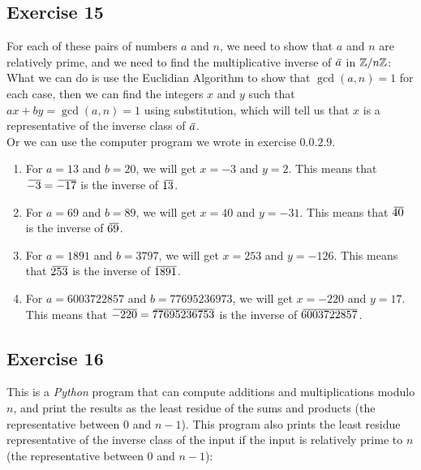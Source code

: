 \documentclass[12pt]{article}
\begin{document}
    \subsection*{Exercise 15}
    For each of these pairs of numbers $a$ and $n$,
    we need to show that $a$ and $n$ are relatively prime,
    and we need to find the multiplicative inverse of $\,\overline{\!{a}}$
    in $\mathbb{Z}/n\mathbb{Z}$: \\
    What we can do is use the Euclidian Algorithm
    to show that $\gcd(a, n) = 1$ for each case,
    then we can find the integers $x$ and $y$
    such that $ax + by = \gcd(a, n) = 1$ using substitution,
    which will tell us that $x$ is a representative of
    the inverse class of $\,\overline{\!{a}}$. \\
    Or we can use the computer program we wrote in exercise $0.0.2.9$. \\ 
    \begin{enumerate}[label=\textbf{\alph*.}]
        \item 
            For $a = 13$ and $b = 20$,
            we will get $x = -3$ and $y = 2$.
            This means that $\,\overline{\!{-3}} = \,\overline{\!{-17}}$
            is the inverse of $\,\overline{\!{13}}$.
        \item 
            For $a = 69$ and $b = 89$,
            we will get $x = 40$ and $y = -31$.
            This means that $\,\overline{\!{40}}$
            is the inverse of $\,\overline{\!{69}}$.
        \item 
            For $a = 1891$ and $b = 3797$,
            we will get $x = 253$ and $y = -126$.
            This means that $\,\overline{\!{253}}$
            is the inverse of $\,\overline{\!{1891}}$.
        \item 
            For $a = 6003722857$ and $b = 77695236973$,
            we will get $x = -220$ and $y = 17$.
            This means that $\,\overline{\!{-220}} = \,\overline{\!{77695236753}}$
            is the inverse of $\,\overline{\!{6003722857}}$.
    \end{enumerate}
 
    \subsection*{Exercise 16}
    This is a \textit{Python} program that can compute
    additions and multiplications modulo $n$,
    and print the results as the least residue of
    the sums and products (the representative between $0$ and $n-1$).
    This program also prints the least residue representative
    of the inverse class of the input if the input is relatively
    prime to $n$ (the representative between $0$ and $n-1$):
\end{document}
